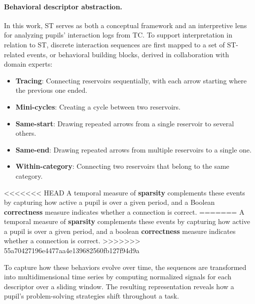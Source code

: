 \paragraph{Behavioral descriptor abstraction.}
In this work, ST serves as both a conceptual framework and an interpretive lens for analyzing pupils' interaction logs from TC.
To support interpretation in relation to ST, discrete interaction sequences are first mapped to a set of ST-related events, or behavioral building blocks, derived in collaboration with domain experts:
\begin{itemize}
    \item
    \textbf{Tracing}: Connecting reservoirs sequentially, with each arrow starting where the previous one ended.
    
    \item 
    \textbf{Mini-cycles}: Creating a cycle between two reservoirs.
    
    \item
    \textbf{Same-start}: Drawing repeated arrows from a single reservoir to several others.
    
    \item
    \textbf{Same-end}: Drawing repeated arrows from multiple reservoirs to a single one.
    
    \item 
    \textbf{Within-category}: Connecting two reservoirs that belong to the same category.
\end{itemize}
<<<<<<< HEAD
A temporal measure of \textbf{sparsity} complements these events by capturing how active a pupil is over a given period, and a Boolean \textbf{correctness} measure indicates whether a connection is correct.
=======
A temporal measure of \textbf{sparsity} complements these events by capturing how active a pupil is over a given period, and a boolean \textbf{correctness} measure indicates whether a connection is correct.
>>>>>>> 55a70427196e4477aa4e139682560fb127f94d9a

To capture how these behaviors evolve over time, the sequences are transformed into multidimensional time series by computing normalized signals for each descriptor over a sliding window.
The resulting representation reveals how a pupil's problem-solving strategies shift throughout a task. 


